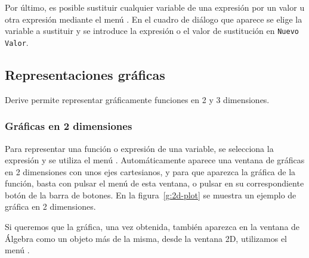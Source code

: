 Por último, es posible sustituir cualquier variable de una expresión
por un valor u otra expresión mediante el menú
. En el cuadro de diálogo
que aparece se elige la variable a sustituir y se introduce la
expresión o el valor de sustitución en \texttt{Nuevo Valor}.

\subsection*{Representaciones gráficas}
Derive permite representar gráficamente funciones en 2 y 3
dimensiones.
\subsubsection*{Gráficas en 2 dimensiones}
Para representar una función o expresión de una variable, se
selecciona la expresión y se utiliza el menú . Automáticamente aparece una ventana de gráficas en 2
dimensiones con unos ejes cartesianos, y para que aparezca la
gráfica de la función, basta con pulsar el menú
 de esta ventana, o pulsar en su
correspondiente botón de la barra de botones. En la
figura~\ref{g:2d-plot} se muestra un ejemplo de gráfica en 2
dimensiones.

Si queremos que la gráfica, una vez obtenida, también aparezca en la
ventana de Álgebra como un objeto más de la misma, desde la ventana
2D, utilizamos el menú .

